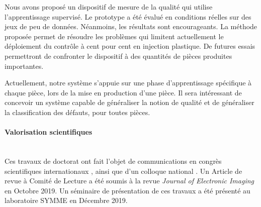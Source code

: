 Nous avons proposé un dispositif de mesure de la qualité qui utilise l’apprentissage supervisé.
Le prototype a été évalué en conditions réelles sur des jeux de peu de données.
Néanmoins, les résultats sont encourageants.
La méthode proposée permet de résoudre les problèmes qui limitent actuellement le déploiement du contrôle à cent pour cent en injection plastique.
De futures essais permettront de confronter le dispositif à des quantités de pièces produites importantes.

Actuellement, notre système s’appuie sur une phase d’apprentissage spécifique à chaque pièce, lors de la mise en production d’une pièce.
Il sera intéressant de concevoir un système capable de généraliser la notion de qualité et de généraliser la classification des défauts, pour toutes pièces.

\bigskip

\bigskip

\paragraph{Valorisation scientifiques}\mbox{} \\
%
%

Ces travaux de doctorat ont fait l’objet de communications en congrès scientifiques internationaux \cite{nagorny_towards_2017, nagorny_injection_2017, nagorny_quality_2017, nagorny_generative_2018, nagorny_polarimetric_2019}, ainsi que d'un colloque national \cite{nagorny_towards_2017}.
Un Article de revue à Comité de Lecture a été soumis à la revue \textit{Journal of Electronic Imaging} en Octobre 2019.
Un séminaire de présentation de ces travaux a été présenté au laboratoire SYMME en Décembre 2019.

